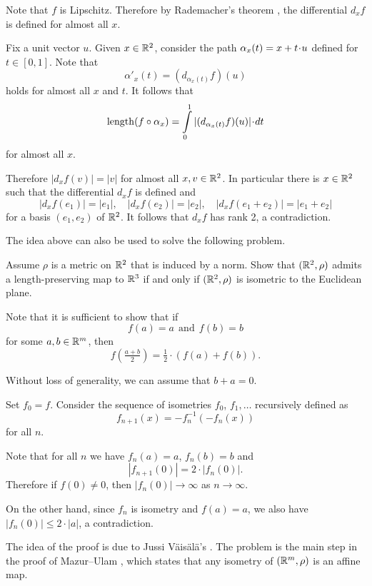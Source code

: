 Note that $f$ is Lipschitz.
Therefore by Rademacher's theorem \cite[see][]{rademacher}, the differential $d_xf$ is defined for  almost all $x$.

Fix a unit vector $u$.
Given $x\in\mathbb{R}^2$,
consider the path $\alpha_x(t)\z=x+t\cdot u$ defined for $t\in [0,1]$.
Note that  
\[\alpha'_x(t)=(d_{\alpha_x(t)}f)(u)\]
holds for almost all $x$ and $t$.
It follows that 
\[\length(f\circ\alpha_x)=\int\limits_0^1 |(d_{\alpha_x(t)}f)(u)| \cdot dt\]
for almost all $x$.

Therefore $|d_xf(v)|=|v|$ for almost all $x,v\in\mathbb{R}^2$.
In particular there is $x\in\mathbb{R}^2$ such that the differential $d_xf$ is defined 
and 
\[|d_xf(e_1)|=|e_1|,
\quad
|d_xf(e_2)|=|e_2|,
\quad
|d_xf(e_1+e_2)|=|e_1+e_2|\]
for a basis $(e_1,e_2)$ of $\mathbb{R}^2$.
It follows that $d_xf$ has rank 2, a contradiction. \qeds 


The idea above can also be used to solve the following problem.

\begin{pr} Assume $\rho$ is a metric on $\mathbb{R}^2$ that is induced by a norm.
Show that $(\mathbb{R}^2,\rho)$ admits 
a length-preserving map
to $\mathbb{R}^3$ 
if and only if 
$(\mathbb{R}^2,\rho)$ is isometric to the Euclidean plane.
\end{pr}








Note that it is sufficient to show that 
if 
\[f(a)=a\ \ \text{and}\ \ f(b)=b\]
for some $a,b\in\mathbb{R}^m$,
then 
\[f(\tfrac{a+b}2)=\tfrac12\cdot(f(a)+f(b)).\]


Without loss of generality, we can assume that $b+a=0$.

Set $f_0=f$.
Consider the sequence of isometries $f_0$, $f_1,\dots$ recursively defined as
\[f_{n+1}(x)= -f_n^{-1}(-f_n(x))\]
for all $n$.

Note that for all $n$ we have $f_n(a)=a$, $f_n(b)=b$ and 
$$|f_{n+1}(0)|=2\cdot|f_n(0)|.$$
Therefore  
if $f(0)\ne 0$,
then $|f_n(0)|\to\infty$ as $n\to\infty$.

On the other hand, since $f_n$ is isometry and $f(a)=a$,
we also have $|f_n(0)|\le 2\cdot |a|$, a contradiction.
\qeds

The idea of the proof is due to  Jussi V\"ais\"al\"a's \cite[see][]{vaisala}.
The problem is the main step in the proof of Mazur--Ulam  \cite[see][]{mazur-ulam},
which states that any isometry of $(\mathbb{R}^m,\rho)$ is an affine map. 


